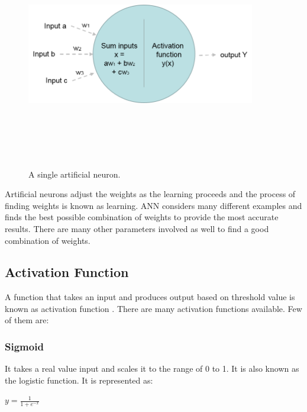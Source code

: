\begin{figure}[htpb]
	\centering
	\includegraphics[width=10cm,height=10cm,keepaspectratio=true]{images/single-neuron}
	\caption{
		A single artificial neuron.
	}
	\label{fig:single-neuron}
\end{figure}

Artificial neurons adjust the weights as the learning proceeds and the process of finding weights is known as learning. ANN considers many different examples and finds the best possible combination of weights to provide the most accurate results. There are many other parameters involved as well to find a good combination of weights.

\subsection{Activation Function}

A function that takes an input and produces output based on threshold value is known as activation function \cite{ujjwalkarn}. There are many activation functions available. Few of them are:

\subsubsection{Sigmoid}
It takes a real value input and scales it to the range of 0 to 1. It is also known as the logistic function. It is represented as:

\begin{center}
	$y = \frac{1}{1 + e^{-x}}$
\end{center}

